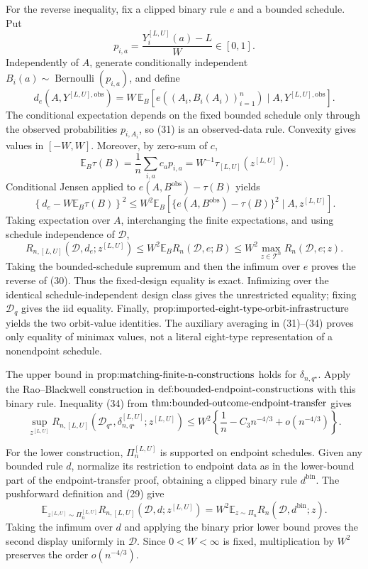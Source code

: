 For the reverse inequality, fix a clipped binary rule \(e\) and a bounded schedule.  Put
\[
p_{i,a}=\frac{Y_i^{[L,U]}(a)-L}{W}\in[0,1].
\]
Independently of \(A\), generate conditionally independent \(B_i(a)\sim\operatorname{Bernoulli}(p_{i,a})\), and define
\[
d_e(A,Y^{[L,U],\mathrm{obs}})
=W\,\mathbb E_B\left[
e((A_i,B_i(A_i))_{i=1}^n)\mid A,Y^{[L,U],\mathrm{obs}}
\right].
\tag{31}
\]
The conditional expectation depends on the fixed bounded schedule only through the observed probabilities \(p_{i,A_i}\), so (31) is an observed-data rule.  Convexity gives values in \([-W,W]\).  Moreover, by zero-sum of \(c\),
\[
\mathbb E_B\tau(B)
=\frac1n\sum_{i,a}c_ap_{i,a}
=W^{-1}\tau_{[L,U]}(z^{[L,U]}).
\tag{32}
\]
Conditional Jensen applied to \(e(A,B^{\mathrm{obs}})-\tau(B)\) yields
\[
\left\{d_e-W\mathbb E_B\tau(B)\right\}^2
\leq W^2\mathbb E_B\left[
\{e(A,B^{\mathrm{obs}})-\tau(B)\}^2\mid A,z^{[L,U]}
\right].
\tag{33}
\]
Taking expectation over \(A\), interchanging the finite expectations, and using schedule independence of \(\mathcal D\),
\[
R_{n,[L,U]}(\mathcal D,d_e;z^{[L,U]})
\leq W^2\mathbb E_BR_n(\mathcal D,e;B)
\leq W^2\max_{z\in\mathcal T^n}R_n(\mathcal D,e;z).
\tag{34}
\]
Taking the bounded-schedule supremum and then the infimum over \(e\) proves the reverse of (30).  Thus the fixed-design equality is exact.  Infimizing over the identical schedule-independent design class gives the unrestricted equality; fixing \(\mathcal D_q\) gives the iid equality.  Finally, \(\textnormal{prop:imported-eight-type-orbit-infrastructure}\) yields the two orbit-value identities.  The auxiliary averaging in (31)--(34) proves only equality of minimax values, not a literal eight-type representation of a nonendpoint schedule.

The upper bound in \(\textnormal{prop:matching-finite-n-constructions}\) holds for \(\delta_{n,q^\star}\).  Apply the Rao--Blackwell construction in \(\textnormal{def:bounded-endpoint-constructions}\) with this binary rule.  Inequality (34) from \(\textnormal{thm:bounded-outcome-endpoint-transfer}\) gives
\[
\sup_{z^{[L,U]}}R_{n,[L,U]}(\mathcal D_{q^\star},
\delta_{n,q^\star}^{[L,U]};z^{[L,U]})
\leq W^2\left\{\frac1n-C_3n^{-4/3}+o(n^{-4/3})\right\}.
\]

For the lower construction, \(\Pi_n^{[L,U]}\) is supported on endpoint schedules.  Given any bounded rule \(d\), normalize its restriction to endpoint data as in the lower-bound part of the endpoint-transfer proof, obtaining a clipped binary rule \(d^{\mathrm{bin}}\).  The pushforward definition and (29) give
\[
\mathbb E_{z^{[L,U]}\sim\Pi_n^{[L,U]}}
R_{n,[L,U]}(\mathcal D,d;z^{[L,U]})
=W^2\mathbb E_{z\sim\Pi_n}R_n(\mathcal D,d^{\mathrm{bin}};z).
\]
Taking the infimum over \(d\) and applying the binary prior lower bound proves the second display uniformly in \(\mathcal D\).  Since \(0<W<\infty\) is fixed, multiplication by \(W^2\) preserves the order \(o(n^{-4/3})\).

